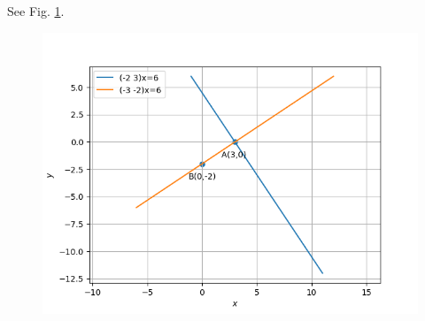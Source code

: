 \documentclass[12pt]{article}
\begin{document}
See Fig. 
\ref{fig:11/10/4/3line segmenta}.
\begin{figure}[h!]
\centering
\includegraphics[width=\columnwidth]{chapters/11/10/4/3/figs/inter.png}
\caption{}
\label{fig:11/10/4/3line segmenta}
\end{figure}
\end{document}
